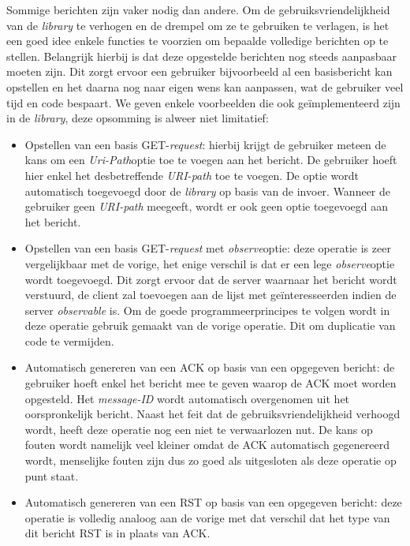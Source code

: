 Sommige berichten zijn vaker nodig dan andere. Om de gebruiksvriendelijkheid van de \textit{library} te verhogen en de drempel om ze te gebruiken te verlagen, is het een goed idee enkele functies te voorzien om bepaalde volledige berichten op te stellen. Belangrijk hierbij is dat deze opgestelde berichten nog steeds aanpasbaar moeten zijn. Dit zorgt ervoor een gebruiker bijvoorbeeld al een basisbericht kan opstellen en het daarna nog naar eigen wens kan aanpassen, wat de gebruiker veel tijd en code bespaart. We geven enkele voorbeelden die ook ge\"{i}mplementeerd zijn in de \textit{library}, deze opsomming is alweer niet limitatief:
\begin{itemize}
\item Opstellen van een basis GET-\textit{request}: hierbij krijgt de gebruiker meteen de kans om een \textit{Uri-Path}optie toe te voegen aan het bericht. De gebruiker hoeft hier enkel het desbetreffende \textit{URI-path} toe te voegen. De optie wordt automatisch toegevoegd door de \textit{library} op basis van de invoer. Wanneer de gebruiker geen \textit{URI-path} meegeeft, wordt er ook geen optie toegevoegd aan het bericht.
\item Opstellen van een basis GET-\textit{request} met \textit{observe}optie: deze operatie is zeer vergelijkbaar met de vorige, het enige verschil is dat er een lege \textit{observe}optie wordt toegevoegd. Dit zorgt ervoor dat de server waarnaar het bericht wordt verstuurd, de client zal toevoegen aan de lijst met ge\"{i}nteresseerden indien de server \textit{observable} is. Om de goede programmeerprincipes te volgen wordt in deze operatie gebruik gemaakt van de vorige operatie. Dit om duplicatie van code te vermijden.
\item Automatisch genereren van een ACK op basis van een opgegeven bericht: de gebruiker hoeft enkel het bericht mee te geven waarop de ACK moet worden opgesteld. Het \textit{message-ID} wordt automatisch overgenomen uit het oorspronkelijk bericht. Naast het feit dat de gebruiksvriendelijkheid verhoogd wordt, heeft deze operatie nog een niet te verwaarlozen nut. De kans op fouten wordt namelijk veel kleiner omdat de ACK automatisch gegenereerd wordt, menselijke fouten zijn dus zo goed als uitgesloten als deze operatie op punt staat.
\item Automatisch genereren van een RST op basis van een opgegeven bericht: deze operatie is volledig analoog aan de vorige met dat verschil dat het type van dit bericht RST is in plaats van ACK.
\end{itemize}


